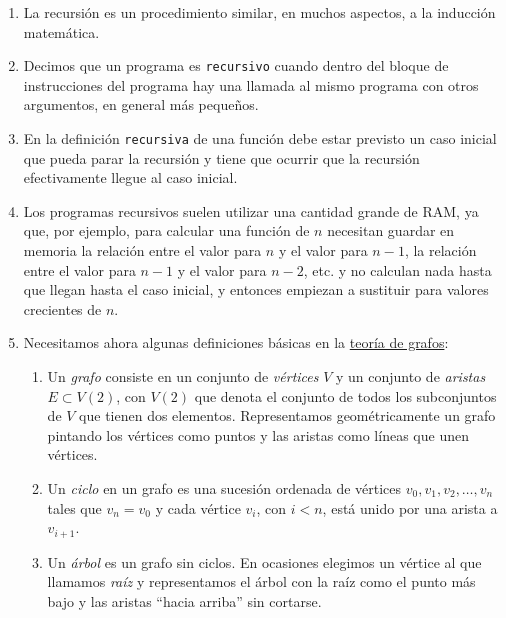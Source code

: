 \begin{enumerate}
\item La recursión es un procedimiento similar, en muchos aspectos, a la
inducción matemática.
\item Decimos que un programa es {\tt recursivo} cuando dentro del bloque de
instrucciones del programa hay una llamada al mismo programa con otros
argumentos, en general m\'as peque\~nos. 
\item En la definición {\tt recursiva} de una función debe estar previsto un
caso inicial que {\sc pueda parar} la recursión y tiene que ocurrir que {\sc
la recursión efectivamente llegue al caso inicial.}
\item Los programas recursivos suelen utilizar una cantidad grande de RAM, ya
que, por ejemplo, para calcular una función de $n$ necesitan guardar en
memoria la relación entre el valor para $n$ y el valor para $n-1$, la
relación entre el valor para $n-1$ y el valor para $n-2$, etc. y no calculan
nada hasta que llegan hasta el caso inicial, y entonces
empiezan a sustituir para valores crecientes de $n$.


\item Necesitamos ahora algunas definiciones básicas en la
\hyperref[grafos]{teoría de
grafos}:

\begin{enumerate}

\item Un {\itshape grafo} consiste en un conjunto de {\itshape vértices} $V$ y
un conjunto de {\itshape aristas} $E\subset V(2)$,  con $V(2)$ que denota el
conjunto de todos los subconjuntos de $V$ que tienen dos elementos.
Representamos geométricamente un grafo pintando  los vértices como puntos y
las aristas como líneas que unen vértices.
 
 

\item Un {\itshape ciclo} en un grafo es una sucesión ordenada de vértices
$v_0,v_1,v_2,\dots,v_n$ tales que $v_n=v_0$ y cada vértice $v_i$, con $i<n$,
está unido por una arista a $v_{i+1}$.


\item Un  {\itshape árbol} es un grafo sin ciclos. En ocasiones elegimos un
vértice al que llamamos {\itshape raíz} y representamos el árbol con la
raíz como el punto más bajo y las aristas ``hacia arriba'' sin cortarse. 




\end{enumerate}
\end{enumerate}
